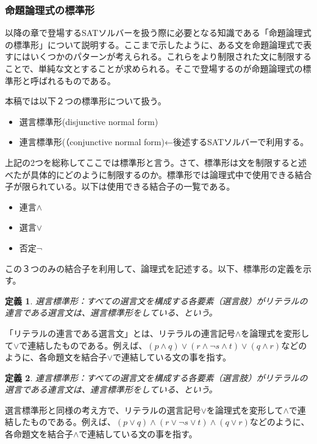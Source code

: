 \documentclass[dvipdfmx]{jsarticle}
\newtheorem{dfn}{定義}
\begin{document}
\subsubsection{命題論理式の標準形}
以降の章で登場するSATソルバーを扱う際に必要となる知識である「命題論理式の標準形」について説明する。ここまで示したように、ある文を命題論理式で表すにはいくつかのパターンが考えられる。これらをより制限された文に制限することで、単純な文とすることが求められる。そこで登場するのが命題論理式の標準形と呼ばれるものである。\par
本稿では以下２つの標準形について扱う。
\begin{itemize}
  \item 選言標準形(disjunctive normal form)
  \item 連言標準形(（conjunctive normal form)←後述するSATソルバーで利用する。
\end{itemize}
上記の2つを総称してここでは標準形と言う。さて、標準形は文を制限すると述べたが具体的にどのように制限するのか。標準形では論理式中で使用できる結合子が限られている。以下は使用できる結合子の一覧である。
\begin{itemize}
  \item 連言$\wedge$
  \item 選言$\vee$
  \item 否定$\neg$
\end{itemize}
この３つのみの結合子を利用して、論理式を記述する。以下、標準形の定義を示す。
\begin{dfn}
  選言標準形：すべての選言文を構成する各要素（選言肢）がリテラルの連言である選言文は、選言標準形をしている、という。
\end{dfn}
「リテラルの連言である選言文」とは、リテラルの連言記号$\wedge$を論理式を変形して$\vee$で連結したものである。例えば、$(p \wedge q) \vee (r \wedge \neg s \wedge t) \vee (q \wedge r)$などのように、各命題文を結合子$\vee$で連結している文の事を指す。
\begin{dfn}
  連言標準形：すべての選言文を構成する各要素（選言肢）がリテラルの選言である連言文は、連言標準形をしている、という。
\end{dfn}
選言標準形と同様の考え方で、リテラルの選言記号$\vee$を論理式を変形して$\wedge$で連結したものである。例えば、$(p \vee q) \wedge (r \vee \neg s \vee t) \wedge (q \vee r)$などのように、各命題文を結合子$\wedge$で連結している文の事を指す。
\end{document}
